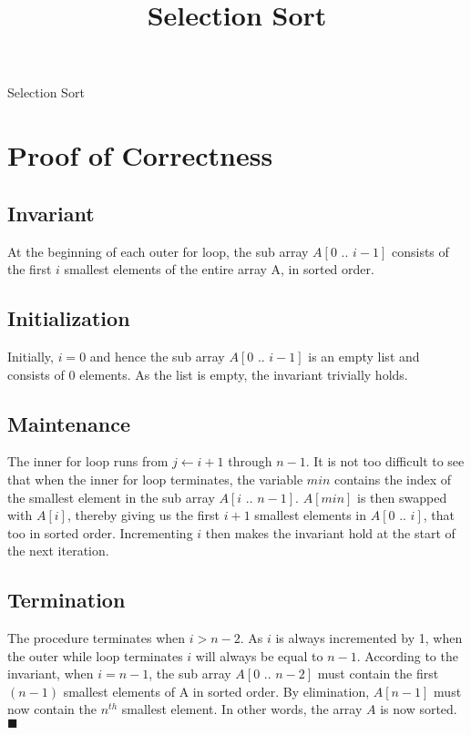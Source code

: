 \documentclass[10pt,a4paper]{article}
\title{Selection Sort}
\date{}
\begin{document}
\maketitle

\begin{algorithm}[H]
  \BlankLine
 \caption{Selection Sort}
\end{algorithm}

\section{Proof of Correctness}
\subsection{Invariant}
At the beginning of each outer for loop, the sub array $A[0 \text{ .. } i-1]$ consists of the first $i$ smallest elements of the entire array A, in sorted order.

\subsection{Initialization}
Initially, $i = 0$ and hence the sub array $A[0 \text{ .. } i-1]$ is an empty list and consists of 0 
elements. As the list is empty, the invariant trivially holds.

\subsection{Maintenance}
The inner for loop runs from $j \leftarrow i+1$ through $n-1$. It is not too difficult to see that when the inner for loop terminates, the variable $min$ contains the index of the smallest element in the sub array $A[i \text{ .. } n-1]$. $A[min]$ is then swapped with $A[i]$, thereby giving us the first $i+1$ smallest elements in $A[0 \text{ .. } i]$, that too in sorted order. Incrementing $i$ then makes the invariant hold at the start of the next iteration.

\subsection{Termination}
The procedure terminates when $ i > n-2$. As $i$ is always incremented by 1, when the
outer while loop terminates $i$ will always be equal to $n-1$. According to the invariant, 
when $i = n-1$, the sub array $A[0 \text{ .. } n-2]$ must contain the first $(n-1)$ smallest elements
of A in sorted order. By elimination, $A[n-1]$ must now contain the $n^{th}$ smallest element.
In other words, the array $A$ is now sorted. $\blacksquare$

	
\end{document}

